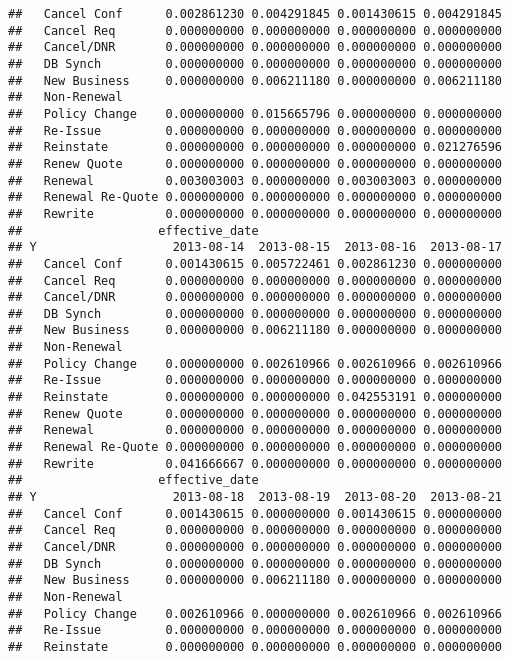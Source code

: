 \documentclass[]{article}
\begin{document}
\begin{verbatim}
##   Cancel Conf      0.002861230 0.004291845 0.001430615 0.004291845
##   Cancel Req       0.000000000 0.000000000 0.000000000 0.000000000
##   Cancel/DNR       0.000000000 0.000000000 0.000000000 0.000000000
##   DB Synch         0.000000000 0.000000000 0.000000000 0.000000000
##   New Business     0.000000000 0.006211180 0.000000000 0.006211180
##   Non-Renewal                                                     
##   Policy Change    0.000000000 0.015665796 0.000000000 0.000000000
##   Re-Issue         0.000000000 0.000000000 0.000000000 0.000000000
##   Reinstate        0.000000000 0.000000000 0.000000000 0.021276596
##   Renew Quote      0.000000000 0.000000000 0.000000000 0.000000000
##   Renewal          0.003003003 0.000000000 0.003003003 0.000000000
##   Renewal Re-Quote 0.000000000 0.000000000 0.000000000 0.000000000
##   Rewrite          0.000000000 0.000000000 0.000000000 0.000000000
##                   effective_date
## Y                   2013-08-14  2013-08-15  2013-08-16  2013-08-17
##   Cancel Conf      0.001430615 0.005722461 0.002861230 0.000000000
##   Cancel Req       0.000000000 0.000000000 0.000000000 0.000000000
##   Cancel/DNR       0.000000000 0.000000000 0.000000000 0.000000000
##   DB Synch         0.000000000 0.000000000 0.000000000 0.000000000
##   New Business     0.000000000 0.006211180 0.000000000 0.000000000
##   Non-Renewal                                                     
##   Policy Change    0.000000000 0.002610966 0.002610966 0.002610966
##   Re-Issue         0.000000000 0.000000000 0.000000000 0.000000000
##   Reinstate        0.000000000 0.000000000 0.042553191 0.000000000
##   Renew Quote      0.000000000 0.000000000 0.000000000 0.000000000
##   Renewal          0.000000000 0.000000000 0.000000000 0.000000000
##   Renewal Re-Quote 0.000000000 0.000000000 0.000000000 0.000000000
##   Rewrite          0.041666667 0.000000000 0.000000000 0.000000000
##                   effective_date
## Y                   2013-08-18  2013-08-19  2013-08-20  2013-08-21
##   Cancel Conf      0.001430615 0.000000000 0.001430615 0.000000000
##   Cancel Req       0.000000000 0.000000000 0.000000000 0.000000000
##   Cancel/DNR       0.000000000 0.000000000 0.000000000 0.000000000
##   DB Synch         0.000000000 0.000000000 0.000000000 0.000000000
##   New Business     0.000000000 0.006211180 0.000000000 0.000000000
##   Non-Renewal                                                     
##   Policy Change    0.002610966 0.000000000 0.002610966 0.002610966
##   Re-Issue         0.000000000 0.000000000 0.000000000 0.000000000
##   Reinstate        0.000000000 0.000000000 0.000000000 0.000000000

\end{verbatim}
\end{document}
